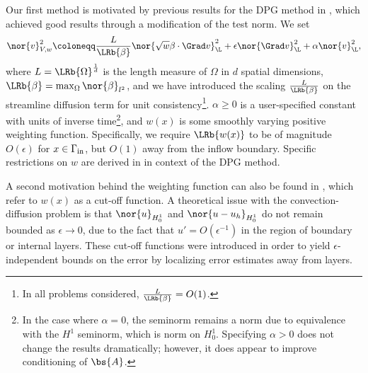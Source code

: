 Our first method is motivated by previous results for the DPG method in \cite{DPGrobustness}, which achieved good results through a modification of the test norm.  We set
\[
\nor{v}_{V,w}^2 \coloneqq \frac{L}{\LRb{\beta}}\nor{\sqrt{w}\beta\cdot \Grad v}_{\L}^2 + \epsilon\nor{\Grad v}_{\L}^2 + \alpha\nor{v}_{\L}^2,
\]
where $L = \LRb{\Omega}^{\frac{1}{d}}$ is the length measure of $\Omega$ in $d$ spatial dimensions, $\LRb{\beta} = \max_\Omega \nor{\beta}_{l^2}$, and we have introduced the scaling $\frac{L}{\LRb{\beta}}$ on the streamline diffusion term for unit consistency\footnote{In all problems considered, $\frac{L}{\LRb{\beta}} = O(1)$.}. $\alpha \geq 0$ is a user-specified constant with units of inverse time\footnote{In the case where $\alpha = 0$, the seminorm remains a norm due to equivalence with the $H^1$ seminorm, which is norm on $H^1_0$.  Specifying $\alpha > 0$ does not change the results dramatically; however, it does appear to improve conditioning of $\bs{A}$.}, and $w(x)$ is some smoothly varying positive weighting function.  Specifically, we require $\LRb{w(x)}$ to be of magnitude $O(\epsilon)$ for $x\in \Gamma_{\rm in}$, but $O(1)$ away from the inflow boundary.  Specific restrictions on $w$ are derived in \cite{DPGrobustness} in context of the DPG method.  

A second motivation behind the weighting function can also be found in \cite{stynesSUPG, roos2008robust, johnsonCrosswind}, which refer to $w(x)$ as a cut-off function.  A theoretical issue with the convection-diffusion problem is that $\nor{u}_{H^1_0}$ and $\nor{u-u_h}_{H^1_0}$ do not remain bounded as $\epsilon\rightarrow 0$, due to the fact that $u' = O(\epsilon^{-1})$ in the region of boundary or internal layers.  These cut-off functions were introduced in order to yield $\epsilon$-independent bounds on the error by localizing error estimates away from layers.

